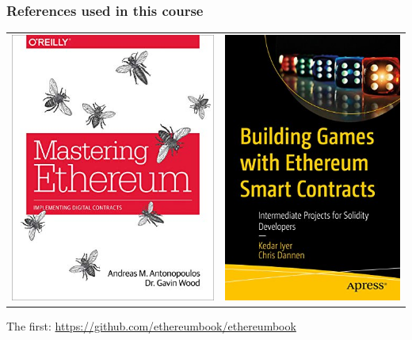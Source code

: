 \documentclass[11pt]{beamer}  %
\begin{document}
\begin{frame}\frametitle{References used in this course}

  \begin{center}
  \begin{tabular}{c@{\hskip 1.5cm}c}
    \includegraphics[scale=.3,clip=false]{pictures/mastering-ethereum.jpg} &
    \includegraphics[scale=.3,clip=false]{pictures/building-games.jpg}
  \end{tabular}
  \end{center}

  The first: \url{https://github.com/ethereumbook/ethereumbook}

\end{frame}
\end{document}
